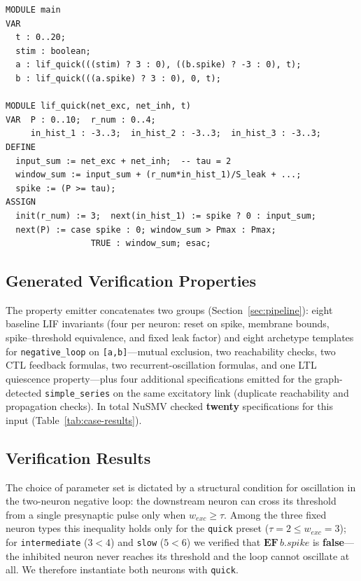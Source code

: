 \documentclass[
]{ceurart}
\begin{document}
\begin{lstlisting}[style=smvcode,caption={Excerpt of generated \texttt{model.smv} (case study).},label=lst:case-model]
MODULE main
VAR
  t : 0..20;
  stim : boolean;
  a : lif_quick(((stim) ? 3 : 0), ((b.spike) ? -3 : 0), t);
  b : lif_quick(((a.spike) ? 3 : 0), 0, t);

MODULE lif_quick(net_exc, net_inh, t)
VAR  P : 0..10;  r_num : 0..4;
     in_hist_1 : -3..3;  in_hist_2 : -3..3;  in_hist_3 : -3..3;
DEFINE
  input_sum := net_exc + net_inh;  -- tau = 2
  window_sum := input_sum + (r_num*in_hist_1)/S_leak + ...;
  spike := (P >= tau);
ASSIGN
  init(r_num) := 3;  next(in_hist_1) := spike ? 0 : input_sum;
  next(P) := case spike : 0; window_sum > Pmax : Pmax;
                 TRUE : window_sum; esac;
\end{lstlisting}

\subsection{Generated Verification Properties}
\label{subsec:case-properties}

The property emitter concatenates two groups (Section~\ref{sec:pipeline}): eight
baseline LIF invariants (four per neuron: reset on spike, membrane bounds,
spike--threshold equivalence, and fixed leak factor) and eight archetype templates
for \texttt{negative\_loop} on \texttt{[a,b]}---mutual exclusion, two reachability
checks, two CTL feedback formulas, two recurrent-oscillation formulas, and one LTL
quiescence property---plus four additional specifications emitted for the
graph-detected \texttt{simple\_series} on the same excitatory link (duplicate
reachability and propagation checks). In total NuSMV checked \textbf{twenty}
specifications for this input (Table~\ref{tab:case-results}).

\subsection{Verification Results}
\label{subsec:case-results}

The choice of parameter set is dictated by a structural condition for oscillation
in the two-neuron negative loop: the downstream neuron can cross its threshold from
a single presynaptic pulse only when $w_{exc} \ge \tau$. Among the three fixed neuron
types this inequality holds only for the \texttt{quick} preset
($\tau = 2 \le w_{exc} = 3$); for \texttt{intermediate} ($3 < 4$) and \texttt{slow}
($5 < 6$) we verified that $\mathbf{EF}\, b.\mathit{spike}$ is \textbf{false}---the
inhibited neuron never reaches its threshold and the loop cannot oscillate at all. We
therefore instantiate both neurons with \texttt{quick}.
\end{document}
